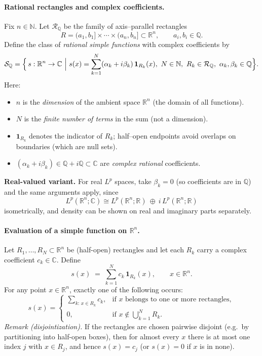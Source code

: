 \documentclass[12pt,a4paper]{article}
\theoremstyle{plain}
\theoremstyle{definition}
\theoremstyle{remark}
\theoremstyle{remark}
\theoremstyle{definition}
\begin{document}
\paragraph{Rational rectangles and complex coefficients.}
Fix $n\in\mathbb N$. Let $\mathcal R_{\mathbb Q}$ be the family of axis–parallel rectangles
\[
R=(a_1,b_1]\times\cdots\times(a_n,b_n]\subset\mathbb R^{n},
\qquad a_i,b_i\in\mathbb Q.
\]
Define the class of \emph{rational simple functions} with complex coefficients by
\[
\mathcal S_{\mathbb Q}
= \Bigl\{\, s:\mathbb R^{n}\to\mathbb C \ \Big|\ 
s(x)=\sum_{k=1}^{N} (\alpha_k+i\beta_k)\,\mathbf 1_{R_k}(x),\ 
N\in\mathbb N,\ R_k\in\mathcal R_{\mathbb Q},\
\alpha_k,\beta_k\in\mathbb Q \Bigr\}.
\]
Here:
\begin{itemize}
	\item $n$ is the \emph{dimension} of the ambient space $\mathbb R^{n}$ (the domain of all functions).
	\item $N$ is the \emph{finite number of terms} in the sum (not a dimension).
	\item $\mathbf 1_{R_k}$ denotes the indicator of $R_k$; half–open endpoints avoid overlaps on boundaries (which are null sets).
	\item $(\alpha_k+i\beta_k)\in\mathbb Q+i\mathbb Q\subset\mathbb C$ are \emph{complex rational} coefficients.
\end{itemize}
\noindent
\textbf{Real-valued variant.} For real $L^p$ spaces, take $\beta_k=0$ (so coefficients are in $\mathbb Q$) and the same arguments apply, since
\[
L^{p}(\mathbb R^{n};\mathbb C)
\cong L^{p}(\mathbb R^{n};\mathbb R)\ \oplus\ i\,L^{p}(\mathbb R^{n};\mathbb R)
\]
isometrically, and density can be shown on real and imaginary parts separately.

\paragraph{Evaluation of a simple function on $\mathbb R^{n}$.}
Let $R_1,\dots,R_N\subset \mathbb R^{n}$ be (half-open) rectangles and let each $R_k$
carry a complex coefficient $c_k\in\mathbb C$. Define
\[
s(x) \;=\; \sum_{k=1}^{N} c_k\,\mathbf 1_{R_k}(x), \qquad x\in\mathbb R^{n}.
\]
For any point $x\in\mathbb R^{n}$, exactly one of the following occurs:
\[
s(x)=
\begin{cases}
	\displaystyle \sum_{k:\,x\in R_k} c_k, & \text{if $x$ belongs to one or more rectangles},\\[8pt]
	0, & \text{if $x\notin \bigcup_{k=1}^{N} R_k$}.
\end{cases}
\]
\emph{Remark (disjointization).}
If the rectangles are chosen pairwise disjoint (e.g.\ by partitioning into half-open boxes),
then for almost every $x$ there is at most one index $j$ with $x\in R_j$, and hence
$s(x)=c_j$ (or $s(x)=0$ if $x$ is in none).
\end{document}
